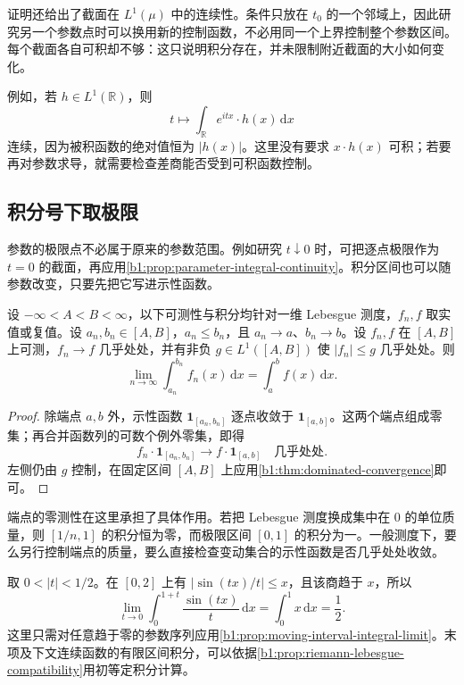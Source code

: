 证明还给出了截面在 \(L^1(\mu)\) 中的连续性。条件只放在 \(t_0\) 的一个邻域上，因此研究另一个参数点时可以换用新的控制函数，不必用同一个上界控制整个参数区间。每个截面各自可积却不够：这只说明积分存在，并未限制附近截面的大小如何变化。

\ProseParagraphBreak

例如，若 \(h\in L^1(\mathbb R)\)，则
\[
t\longmapsto\int_{\mathbb R}e^{itx}\cdot h(x)\,\mathrm dx
\]
连续，因为被积函数的绝对值恒为 \(|h(x)|\)。这里没有要求 \(x\cdot h(x)\) 可积；若要再对参数求导，就需要检查差商能否受到可积函数控制。

\subsection{积分号下取极限}
\label{b1:subsec:050402}

参数的极限点不必属于原来的参数范围。例如研究 \(t\downarrow0\) 时，可把逐点极限作为 \(t=0\) 的截面，再应用\cref{b1:prop:parameter-integral-continuity}。积分区间也可以随参数改变，只要先把它写进示性函数。

\begin{proposition}
\label{b1:prop:moving-interval-integral-limit}
设 \(-\infty<A<B<\infty\)，以下可测性与积分均针对一维 Lebesgue 测度，\(f_n,f\) 取实值或复值。设 \(a_n,b_n\in[A,B]\)，\(a_n\leq b_n\)，且 \(a_n\to a\)、\(b_n\to b\)。设 \(f_n,f\) 在 \([A,B]\) 上可测，\(f_n\to f\) 几乎处处，并有非负 \(g\in L^1([A,B])\) 使 \(|f_n|\leq g\) 几乎处处。则
\[
\lim_{n\to\infty}\int_{a_n}^{b_n}f_n(x)\,\mathrm dx
=\int_a^b f(x)\,\mathrm dx.
\]
\end{proposition}
\begin{proof}
除端点 \(a,b\) 外，示性函数 \(\mathbf1_{[a_n,b_n]}\) 逐点收敛于 \(\mathbf1_{[a,b]}\)。这两个端点组成零集；再合并函数列的可数个例外零集，即得
\[
f_n\cdot\mathbf1_{[a_n,b_n]}
\longrightarrow f\cdot\mathbf1_{[a,b]}
\quad\text{几乎处处}.
\]
左侧仍由 \(g\) 控制，在固定区间 \([A,B]\) 上应用\cref{b1:thm:dominated-convergence}即可。
\end{proof}

端点的零测性在这里承担了具体作用。若把 Lebesgue 测度换成集中在 \(0\) 的单位质量，则 \([1/n,1]\) 的积分恒为零，而极限区间 \([0,1]\) 的积分为一。一般测度下，要么另行控制端点的质量，要么直接检查变动集合的示性函数是否几乎处处收敛。

\ProseParagraphBreak

取 \(0<|t|<1/2\)。在 \([0,2]\) 上有 \(|\sin(tx)/t|\leq x\)，且该商趋于 \(x\)，所以
\[
\lim_{t\to0}\int_0^{1+t}\dfrac{\sin(tx)}{t}\,\mathrm dx
=\int_0^1x\,\mathrm dx=\dfrac12.
\]
这里只需对任意趋于零的参数序列应用\cref{b1:prop:moving-interval-integral-limit}。末项及下文连续函数的有限区间积分，可以依据\cref{b1:prop:riemann-lebesgue-compatibility}用初等定积分计算。

